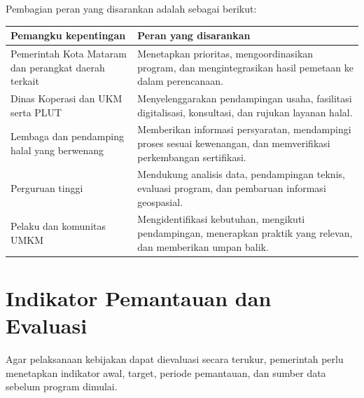 \documentclass[
  indonesian,
  11pt,
  a4paper,
]{report}
\newcounter{none} %
\begin{document}
Pembagian peran yang disarankan adalah sebagai berikut:

{\def\LTcaptype{none} %
\begin{longtable}[]{@{}
  >{\raggedright\arraybackslash}p{}
  >{\raggedright\arraybackslash}p{}@{}}
\toprule\noalign{}
\begin{minipage}[b]{\linewidth}\raggedright
Pemangku kepentingan
\end{minipage} & \begin{minipage}[b]{\linewidth}\raggedright
Peran yang disarankan
\end{minipage} \\
\midrule\noalign{}
\endhead
\bottomrule\noalign{}
\endlastfoot
Pemerintah Kota Mataram dan perangkat daerah terkait & Menetapkan
prioritas, mengoordinasikan program, dan mengintegrasikan hasil pemetaan
ke dalam perencanaan. \\
Dinas Koperasi dan UKM serta PLUT & Menyelenggarakan pendampingan usaha,
fasilitasi digitalisasi, konsultasi, dan rujukan layanan halal. \\
Lembaga dan pendamping halal yang berwenang & Memberikan informasi
persyaratan, mendampingi proses sesuai kewenangan, dan memverifikasi
perkembangan sertifikasi. \\
Perguruan tinggi & Mendukung analisis data, pendampingan teknis,
evaluasi program, dan pembaruan informasi geospasial. \\
Pelaku dan komunitas UMKM & Mengidentifikasi kebutuhan, mengikuti
pendampingan, menerapkan praktik yang relevan, dan memberikan umpan
balik. \\
\end{longtable}
}

\chapter*{Indikator Pemantauan dan
Evaluasi}\label{indikator-pemantauan-dan-evaluasi}

Agar pelaksanaan kebijakan dapat dievaluasi secara terukur, pemerintah
perlu menetapkan indikator awal, target, periode pemantauan, dan sumber
data sebelum program dimulai.
\end{document}
